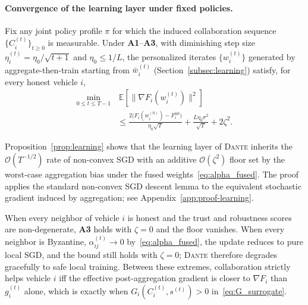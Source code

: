 \paragraph{Convergence of the learning layer under fixed policies.}

\begin{proposition}
\label{prop:learning}
Fix any joint policy profile $\pi$ for which the induced collaboration sequence $\{C_i^{(t)}\}_{t\ge 0}$ is measurable. Under \textbf{A1}--\textbf{A3}, with diminishing step size $\eta_i^{(t)}=\eta_0/\sqrt{t+1}$ and $\eta_0\le 1/L$, the personalized iterates $\{w_i^{(t)}\}$ generated by aggregate-then-train starting from $\bar w_i^{(t)}$ (Section~\ref{subsec:learning}) satisfy, for every honest vehicle $i$,
\begin{equation}
\label{eq:prop1}
\begin{split}
    \min_{0\le t\le T-1}&\,\mathbb{E}\!\left[\bigl\|\nabla F_i(w_i^{(t)})\bigr\|^2\right]\\
    &\le \frac{2\bigl(F_i(w_i^{(0)})-F_i^{\inf}\bigr)}{\eta_0\sqrt{T}} + \frac{L\eta_0\sigma^2}{\sqrt{T}} + 2\zeta^2.
\end{split}
\end{equation}
\end{proposition}

Proposition~\ref{prop:learning} shows that the learning layer of \textsc{Dante} inherits the $\mathcal{O}(T^{-1/2})$ rate of non-convex SGD with an additive $\mathcal{O}(\zeta^2)$ floor set by the worst-case aggregation bias under the fused weights~\eqref{eq:alpha_fused}. The proof applies the standard non-convex SGD descent lemma to the equivalent stochastic gradient induced by aggregation; see Appendix~\ref{app:proof-learning}.

\begin{remark}
\label{rem:fallback}
When every neighbor of vehicle $i$ is honest and the trust and robustness scores are non-degenerate, \textbf{A3} holds with $\zeta=0$ and the floor vanishes. When every neighbor is Byzantine, $\alpha_{ij}^{(t)}\to 0$ by~\eqref{eq:alpha_fused}, the update reduces to pure local SGD, and the bound still holds with $\zeta=0$; \textsc{Dante} therefore degrades gracefully to safe local training. Between these extremes, collaboration strictly helps vehicle $i$ iff the effective post-aggregation gradient is closer to $\nabla F_i$ than $g_i^{(t)}$ alone, which is exactly when $G_i(C_i^{(t)},s^{(t)})>0$ in~\eqref{eq:G_surrogate}.
\end{remark}


